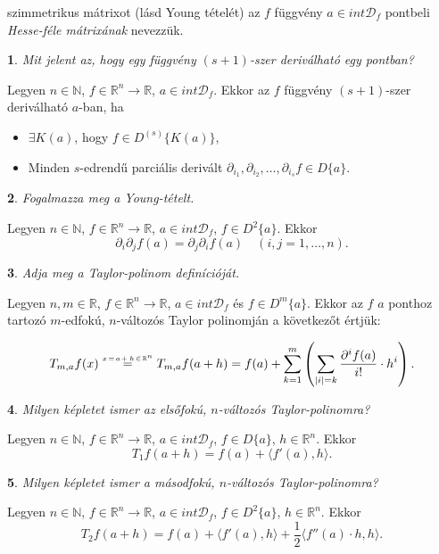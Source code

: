 \documentclass[a4paper]{article}
\def\R{\mathbb{R}}
\def\N{\mathbb{N}}
\theoremstyle{qstyle}
\newtheorem{question}{}{}
\begin{document}
	szimmetrikus mátrixot (lásd Young tételét) az $f$ függvény $a \in int \mathcal{D}_{f}$ pontbeli \emph{Hesse-féle mátrixának} nevezzük.
	
	\begin{question}
		Mit jelent az, hogy egy függvény $(s+1)$-szer deriválható egy pontban?   
	\end{question}
	Legyen $n \in \N$, $f \in \R^n \to \R$, $a \in int\mathcal{D}_f$. Ekkor az $f$ függvény $(s+1)$-szer deriválható $a$-ban, ha
	\begin{itemize}
		\item $\exists K(a)$, hogy $f \in D^{(s)}\{K(a)\}$,
		\item Minden $s$-edrendű parciális derivált $\partial_{i_1}, \partial_{i_2}, \dots, \partial_{i_s} f \in D\{a\}$.
	\end{itemize}
	
	\begin{question}
		Fogalmazza meg a Young-tételt.  
	\end{question}
	Legyen $n \in \N$, $f \in \R^n \to \R$, $a \in int\mathcal{D}_{f}$, $f \in D^2\{a\}$. Ekkor
	$$\partial_i\partial_j f(a) = \partial_j\partial_i f(a) \quad (i,j = 1,\dots,n)\text{.}$$
	
	\begin{question}
		Adja meg a Taylor-polinom definícióját.   
	\end{question}
	Legyen $n, m \in \R$, $f \in \R^n \to \R$, $a \in int\mathcal{D}_f$ és $f\in D^m\{a\}$. Ekkor az $f$ $a$ ponthoz tartozó $m$-edfokú, $n$-változós Taylor polinomján a következőt értjük:
	
	$$T_{m,a}f(x) \stackrel{\hbox{\tiny$ x\!=\!a\!+h\!\in\!\R^n$}}{\hbox{=}} T_{m,a}f(a+h) = f(a) + \sum_{k=1}^{m} \left(\sum_{|i|=k}^{} \frac{\partial^i f(a)}{i!} \cdot h^i\right) \text{.}$$
	
	\begin{question}
		Milyen képletet ismer az elsőfokú, $n$-változós Taylor-polinomra?   
	\end{question}
	Legyen $n \in \N$, $f \in \R^n\to\R$, $a\in int\mathcal{D}_f$, $f\in D\{a\}$, $h \in \R^n$. Ekkor
	$$T_{1}f(a+h)=f(a)+\langle{f'(a),h}\rangle \text{.}$$
	
	\begin{question}
		Milyen képletet ismer a másodfokú, $n$-változós Taylor-polinomra?   
	\end{question}
	Legyen $n \in \N$, $f \in \R^n\to\R$, $a\in int\mathcal{D}_f$, $f\in D^2\{a\}$, $h \in \R^n$. Ekkor
	$$T_{2}f(a+h)=f(a)+\langle{f'(a),h}\rangle+\frac{1}{2}\langle{f''(a) \cdot h, h}\rangle \text{.}$$
	
\end{document}
